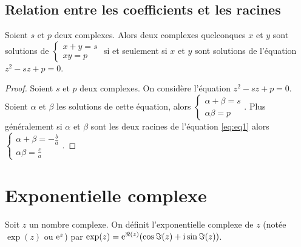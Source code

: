                                 \subsection{Relation entre les coefficients et les racines}
                                \label{subsec:relationcoefsracines}

                                \begin{prop}
                                  Soient \(s\) et \(p\) deux complexes. Alors deux complexes quelconques \(x\) 
                                  et \(y\) sont solutions de \(\begin{cases} x  + y = s \\ xy = p 
                                  \end{cases}\) si et seulement si \(x\) et \(y\) sont solutions de l'équation 
                                  \(z^2 -sz + p = 0\).
                                \end{prop}

                                \begin{proof}
                                  Soient \(s\) et \(p\) deux complexes. On considère l'équation \(z^2-sz + p = 
                                  0\). Soient \(\alpha\) et \(\beta\) les solutions de cette équation, alors
                                  \(\begin{cases} \alpha  + \beta = s \\ \alpha \beta = p \end{cases}\).
                                  Plus généralement si \(\alpha\) et \(\beta\) sont les deux racines de 
                                  l'équation \eqref{eq:eq1} alors \(\begin{cases} \alpha + \beta = 
                                  -\frac{b}{a} \\ \alpha \beta = \frac{c}{a} \end{cases}\).
                                \end{proof}

                                \section{Exponentielle complexe}
                                \label{sec:expcomplexe}

                                \begin{defdef}
                                  Soit \(z\) un nombre complexe. On définit l'exponentielle complexe de \(z\) 
                                  (notée \(\exp(z)\) ou \(\operatorname{e}^z\)) par \(\exp(z) = \operatorname{e}^{\Re(z)}(\cos \Im(z) + 
                                  \operatorname{i} \sin \Im(z))\).
                                \end{defdef}

